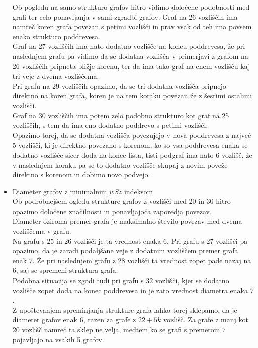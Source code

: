\documentclass[12pt, a4paper]{article}
\begin{document}
\begin{itemize}
Ob pogledu na samo strukturo grafov hitro vidimo določene podobnosti med grafi ter celo ponavljanja v sami zgradbi grafov. Graf na 26 vozliščih ima namreč koren grafa povezan s petimi vozlišči in prav vsak od teh ima povsem enako strukturo poddrevesa. \\
Graf na 27 vozliščih ima nato dodatno vozlišče na koncu poddrevesa, že pri naslednjem grafu pa vidimo da se dodatna vozlišča v primerjavi z grafom na 26 vozliščih pripneta bližje korenu, ter da ima tako graf na enem vozlišču kaj tri veje z dvema vozliščema. \\
Pri grafu na 29 vozliščih opazimo, da se tri dodatna vozlišča pripnejo direktno na koren grafa, koren je na tem koraku povezan že z šestimi ostalimi vozlišči. \\
Graf na 30 vozliščih ima potem zelo podobno strukturo kot graf na 25 vozliščih, s tem da ima eno dodatno poddrevo s petimi vozlišči. \\
Opazimo torej, da se dodatna vozlišča povezujejo v nova poddrevesa z največ 5 vozlišči, ki je direktno povezano s korenom, ko so vsa poddrevesa enaka se dodatno vozlišče sicer doda na konec lista, tisti podgraf ima nato 6 vozlišč, že v naslednjem koraku pa se to dodatno vozlišče skupaj z novim poveže direktno s korenom in dobimo novo podvejo. 

\large  \item  Diameter grafov z minimalnim $wSz$ indeksom\\ \linebreak
Ob podrobnejšem ogledu strukture grafov z vozlišči med 20 in 30 hitro opazimo določene značilnosti in ponavljajoča zaporedja povezav. \\
Diameter oziroma premer grafa je maksimalno število povezav med dvema vozliščema v grafu. \\
Na grafu s $25$ in $26$ vozlišči je ta vrednost enaka $6$. Pri grafu s $27$ vozlišči pa opazimo, da je zaradi podaljšane veje z dodatnim vozliščem premer grafa enak $7$. Že pri naslednjem grafu z $28$ vozlišči ta vrednost zopet pade nazaj na $6$, saj se spremeni struktura grafa. \\
Podobna situacija se zgodi tudi pri grafu s $32$ vozlišči, kjer se dodatno vozlišče zopet doda na konec poddrevesa in je zato vrednost diametra enaka $7$. \\
Z upoštevanjem spreminjanja strukture grafa lahko torej sklepamo, da je diameter grafov enak $6$, razen za grafe z $22 + 5k$ vozlišč. Za grafe z manj kot 20 vozlišč namreč ta sklep ne velja, medtem ko se grafi s premerom $7$ pojavljajo na vsakih 5 grafov.

\end{itemize}
\newpage
\end{document}
